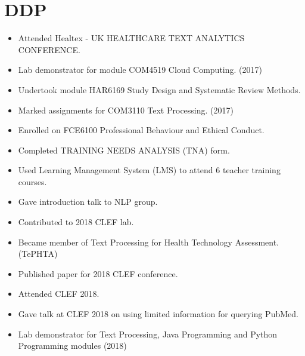 \chapter{DDP} \label{lit}


\begin{itemize}
  \item Attended Healtex - UK HEALTHCARE TEXT ANALYTICS CONFERENCE.
  \item Lab demonstrator for module COM4519 Cloud Computing. (2017)
  \item Undertook module HAR6169 Study Design and Systematic Review Methods.
  \item Marked assignments for COM3110 Text Processing. (2017)
  \item Enrolled on FCE6100 Professional Behaviour and Ethical Conduct.
  \item Completed TRAINING NEEDS ANALYSIS (TNA) form.
  \item Used Learning Management System (LMS) to attend 6 teacher training courses.
  \item Gave introduction talk to NLP group.
  \item Contributed to 2018 CLEF lab.
  \item Became member of Text Processing for Health Technology Assessment. (TePHTA)
  \item Published paper for 2018 CLEF conference.
  \item Attended CLEF 2018.
  \item Gave talk at CLEF 2018 on using limited information for querying PubMed.
  \item Lab demonstrator for Text Processing, Java Programming and Python Programming modules (2018)
  
\end{itemize}
